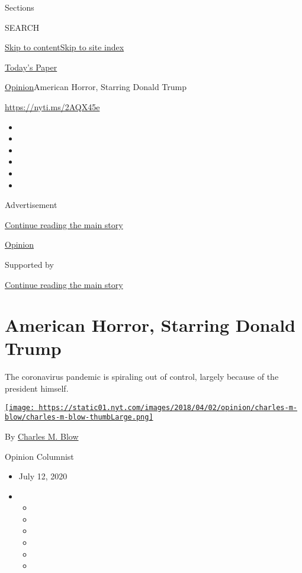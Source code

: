 Sections

SEARCH

\protect\hyperlink{site-content}{Skip to
content}\protect\hyperlink{site-index}{Skip to site index}

\href{https://myaccount.nytimes.com/auth/login?response_type=cookie\&client_id=vi}{}

\href{https://www.nytimes.com/section/todayspaper}{Today's Paper}

\href{/section/opinion}{Opinion}\textbar{}American Horror, Starring
Donald Trump

\href{https://nyti.ms/2AQX45e}{https://nyti.ms/2AQX45e}

\begin{itemize}
\item
\item
\item
\item
\item
\item
\end{itemize}

Advertisement

\protect\hyperlink{after-top}{Continue reading the main story}

\href{/section/opinion}{Opinion}

Supported by

\protect\hyperlink{after-sponsor}{Continue reading the main story}

\hypertarget{american-horror-starring-donald-trump}{%
\section{American Horror, Starring Donald
Trump}\label{american-horror-starring-donald-trump}}

The coronavirus pandemic is spiraling out of control, largely because of
the president himself.

\href{https://www.nytimes.com/by/charles-m-blow}{\texttt{[image: https://static01.nyt.com/images/2018/04/02/opinion/charles-m-blow/charles-m-blow-thumbLarge.png]}}

By \href{https://www.nytimes.com/by/charles-m-blow}{Charles M. Blow}

Opinion Columnist

\begin{itemize}
\item
  July 12, 2020
\item
  \begin{itemize}
  \item
  \item
  \item
  \item
  \item
  \item
  \end{itemize}
\end{itemize}

